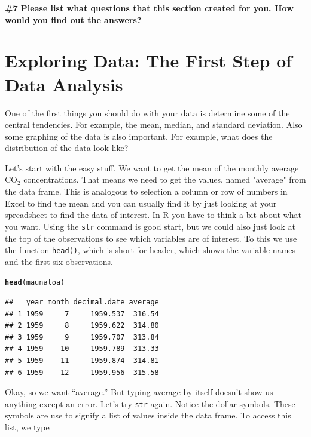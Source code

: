 \documentclass{tufte-handout}\usepackage[]{graphicx}\usepackage[]{xcolor}
\makeatletter
\newcommand{\hlstd}[1]{\textcolor[rgb]{0.345,0.345,0.345}{#1}}%
\newcommand{\hlkwd}[1]{\textcolor[rgb]{0.737,0.353,0.396}{\textbf{#1}}}%
\newenvironment{kframe}{%
 \def\at@end@of@kframe{}%
 \ifinner\ifhmode%
  \def\at@end@of@kframe{\end{minipage}}%
  \begin{minipage}{\columnwidth}%
 \fi\fi%
 \def\FrameCommand##1{\hskip\@totalleftmargin \hskip-\fboxsep
 \colorbox{shadecolor}{##1}\hskip-\fboxsep
     \hskip-\linewidth \hskip-\@totalleftmargin \hskip\columnwidth}%
 \MakeFramed {\advance\hsize-\width
   \@totalleftmargin\z@ \linewidth\hsize
   \@setminipage}}%
 {\par\unskip\endMakeFramed%
 \at@end@of@kframe}
\newenvironment{knitrout}{}{} %
\makeatother
\begin{document}
\bigskip
\noindent \textbf{\#7 Please list what questions that this section created for you. How would you find out the answers? }
 
\section{Exploring Data: The First Step of Data Analysis}

One of the first things you should do with your data is determine some of the central tendencies. For example, the mean, median, and standard deviation. Also some graphing of the data is also important. For example, what does the distribution of the data look like? 

Let's start with the easy stuff. We want to get the mean of the monthly average CO$_2$ concentrations. That means we need to get the values, named "average" from the data frame. This is analogous to selection a column or row of numbers in Excel to find the mean and you can usually find it by just looking at your spreadsheet to find the data of interest. In R you have to think a bit about what you want. Using the \texttt{str} command is good start, but we could also just look at the top of the observations to see which variables are of interest. To this we use the function \texttt{head()}, which is short for header, which shows the variable names and the first six observations.

\begin{knitrout}
\color{fgcolor}\begin{kframe}
\begin{alltt}
\hlkwd{head}\hlstd{(maunaloa)}
\end{alltt}
\begin{verbatim}
##   year month decimal.date average
## 1 1959     7     1959.537  316.54
## 2 1959     8     1959.622  314.80
## 3 1959     9     1959.707  313.84
## 4 1959    10     1959.789  313.33
## 5 1959    11     1959.874  314.81
## 6 1959    12     1959.956  315.58
\end{verbatim}
\end{kframe}
\end{knitrout}

Okay, so we want ``average.'' But typing average by itself doesn't show us anything except an error. Let's try \texttt{str} again. Notice the dollar symbols.  These symbols are use to signify a list of values inside the data frame. To access this list, we type
\end{document}
